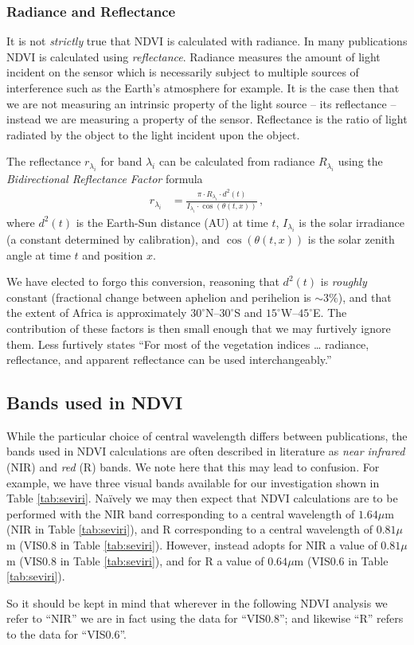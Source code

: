 \subsubsection{Radiance and Reflectance}

It is not \emph{strictly} true that NDVI is calculated with
radiance. In many publications NDVI is calculated using
\emph{reflectance}. Radiance measures the amount of light incident on
the sensor which is necessarily subject to multiple sources of
interference such as the Earth's atmosphere for example. It is the
case then that we are not measuring an intrinsic property of the light
source -- its reflectance -- instead we are measuring a property of the
sensor. Reflectance is the ratio of light radiated by the object to
the light incident upon the object.

The reflectance $r_{\lambda_i}$ for band $\lambda_i$ can be calculated from
radiance $R_{\lambda_i}$ using the \emph{Bidirectional Reflectance Factor}
formula \citep{msgbdrf2012}
\begin{align}
  r_{\lambda_i} &= \frac{\pi \cdot R_{\lambda_i} \cdot d^2\left(t\right)} {I_{\lambda_i} \cdot
    \cos\left(\theta\left(t, x\right)\right)} \,,
\end{align}
where $d^2\left(t\right)$ is the Earth-Sun distance (AU) at time $t$,
$I_{\lambda_i}$ is the solar irradiance (a constant determined by
calibration), and $\cos\left(\theta\left(t, x\right)\right)$ is the solar
zenith angle at time $t$ and position $x$.

We have elected to forgo this conversion, reasoning that
$d^2\left(t\right)$ is \emph{roughly} constant (fractional change
between aphelion and perihelion is ${\sim}3\%$), and that the extent of
Africa is approximately $30^{\circ}$N--$30^{\circ}$S and
$15^{\circ}$W--$45^{\circ}$E. The contribution of these factors is then small
enough that we may furtively ignore them. Less furtively
\cite{ray1994} states ``For most of the vegetation indices {\dots}
radiance, reflectance, and apparent reflectance can be used
interchangeably.''

\subsection{Bands used in NDVI}
\label{sec:ndvi_bands}

While the particular choice of central wavelength differs between
publications, the bands used in NDVI calculations are often described
in literature as \emph{near infrared} (NIR) and \emph{red} (R)
bands. We note here that this may lead to confusion. For example, we
have three visual bands available for our investigation shown in Table
\ref{tab:seviri}. Na{\"i}vely we may then expect that NDVI
calculations are to be performed with the NIR band corresponding to a
central wavelength of $1.64\mu$m (NIR in Table \ref{tab:seviri}), and R
corresponding to a central wavelength of $0.81\mu$m (VIS0.8 in Table
\ref{tab:seviri}). However, \cite{msgndvi2015} instead adopts for NIR
a value of $0.81\mu$m (VIS0.8 in Table \ref{tab:seviri}), and for R a
value of $0.64\mu$m (VIS0.6 in Table \ref{tab:seviri}).

So it should be kept in mind that wherever in the following NDVI
analysis we refer to ``NIR'' we are in fact using the data for
``VIS0.8''; and likewise ``R'' refers to the data for ``VIS0.6''.

